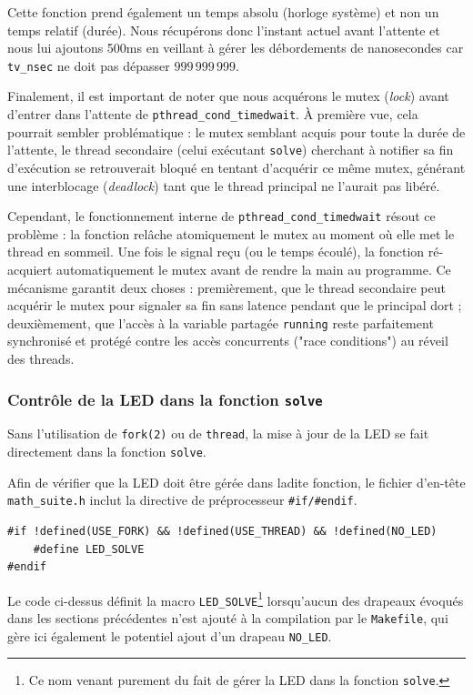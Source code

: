 \documentclass[a4paper,11pt]{article}
\begin{document}
Cette fonction prend également un temps absolu (horloge système) et non un temps relatif (durée). Nous récupérons donc l'instant actuel avant l'attente et nous lui ajoutons 500ms en veillant à gérer les débordements de nanosecondes car \texttt{tv\_nsec} ne doit pas dépasser $999\,999\,999$.

Finalement, il est important de noter que nous acquérons le mutex (\textit{lock}) avant d'entrer dans l'attente de \texttt{pthread\_cond\_timedwait}. À première vue, cela pourrait sembler problématique : le mutex semblant acquis pour toute la durée de l'attente, le thread secondaire (celui exécutant \texttt{solve}) cherchant à notifier sa fin d'exécution se retrouverait bloqué en tentant d'acquérir ce même mutex, générant une interblocage (\textit{deadlock}) tant que le thread principal ne l'aurait pas libéré.

Cependant, le fonctionnement interne de \texttt{pthread\_cond\_timedwait} résout ce problème : la fonction relâche atomiquement le mutex au moment où elle met le thread en sommeil. Une fois le signal reçu (ou le temps écoulé), la fonction ré-acquiert automatiquement le mutex avant de rendre la main au programme. Ce mécanisme garantit deux choses : premièrement, que le thread secondaire peut acquérir le mutex pour signaler sa fin sans latence pendant que le principal dort ; deuxièmement, que l'accès à la variable partagée \texttt{running} reste parfaitement synchronisé et protégé contre les accès concurrents ("race conditions") au réveil des threads.

\subsubsection{Contrôle de la LED dans la fonction \texttt{solve}}

Sans l'utilisation de \texttt{fork(2)} ou de \texttt{thread}, la mise à jour de la LED se fait directement dans la fonction \texttt{solve}.

Afin de vérifier que la LED doit être gérée dans ladite fonction, le fichier d'en-tête \texttt{math\_suite.h} inclut la directive de préprocesseur \texttt{\#if/\#endif}.

\begin{verbatim}
#if !defined(USE_FORK) && !defined(USE_THREAD) && !defined(NO_LED)
    #define LED_SOLVE
#endif
\end{verbatim}

Le code ci-dessus définit la macro \texttt{LED\_SOLVE}\footnote{Ce nom venant purement du fait de gérer la LED dans la fonction \texttt{solve}.} lorsqu'aucun des drapeaux évoqués dans les sections précédentes n'est ajouté à la compilation par le \texttt{Makefile}, qui gère ici également le potentiel ajout d'un drapeau \texttt{NO\_LED}.
\end{document}
